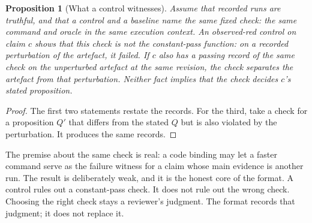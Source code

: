 \documentclass[11pt]{article}
\newtheorem{proposition}{Proposition}
\theoremstyle{definition}
\theoremstyle{remark}
\begin{document}
\begin{proposition}[What a control witnesses]\label{prop:control}
Assume that recorded runs are truthful, and that a control and a baseline name the same fixed
check: the same command and oracle in the same execution context. An observed-red control on
claim $c$ shows that this check is not the constant-pass function: on a recorded perturbation of
the artefact, it failed. If $c$ also has a passing record of the same check on the unperturbed
artefact at the same revision, the check separates the artefact from that perturbation. Neither
fact implies that the check decides $c$'s stated proposition.
\end{proposition}
\begin{proof}
The first two statements restate the records. For the third, take a check for a proposition $Q'$
that differs from the stated $Q$ but is also violated by the perturbation. It produces the same
records.
\end{proof}
\noindent The premise about the same check is real: a code binding may let a faster command serve
as the failure witness for a claim whose main evidence is another run. The result is deliberately
weak, and it is the honest core of the format. A control rules out a constant-pass check. It does
not rule out the wrong check. Choosing the right check stays a reviewer's judgment. The format
records that judgment; it does not replace it.
\end{document}
